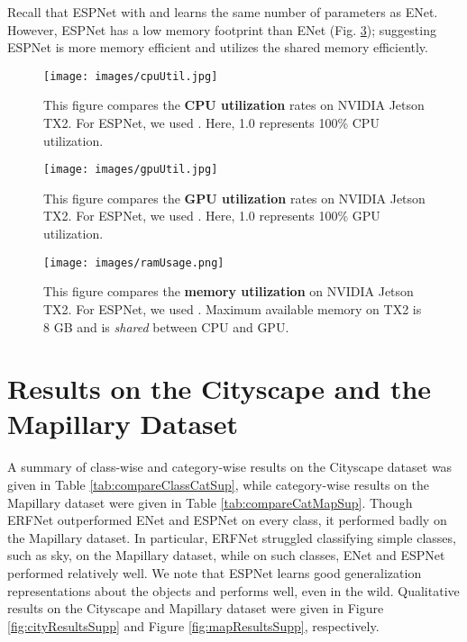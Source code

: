 \documentclass[runningheads]{llncs}
\def\Fig{Fig. }
\begin{document}
Recall that ESPNet with  and  learns the same number of parameters as ENet. However, ESPNet has a low memory footprint than ENet (\Fig \ref{fig:memUtilSupp}); suggesting ESPNet is more memory efficient and utilizes the shared memory efficiently.

\begin{figure}[t!]
\centering
\texttt{[image: images/cpuUtil.jpg]}
\caption{This figure compares the \textbf{CPU utilization} rates on NVIDIA Jetson TX2. For ESPNet, we used . Here, 1.0 represents 100\% CPU utilization.}
\label{fig:cpuUtilSupp}
\end{figure}

\begin{figure}[t!]
\centering
\texttt{[image: images/gpuUtil.jpg]}
\caption{This figure compares the \textbf{GPU utilization} rates on NVIDIA Jetson TX2. For ESPNet, we used . Here, 1.0 represents 100\% GPU utilization. }
\label{fig:gpuUtilSupp}
\end{figure}

\clearpage 

\begin{figure}[t!]
\centering
\texttt{[image: images/ramUsage.png]}
\caption{This figure compares the \textbf{memory utilization} on NVIDIA Jetson TX2. For ESPNet, we used . Maximum available memory on TX2 is 8 GB and is \textit{shared} between CPU and GPU.}
\label{fig:memUtilSupp}
\end{figure}


\section{Results on the Cityscape and the Mapillary Dataset}
\label{sec:resultsSup}
A summary of class-wise and category-wise results on the Cityscape \cite{cordts2016cityscapes} dataset was given in Table \ref{tab:compareClassCatSup}, while category-wise results on the Mapillary \cite{MVD2017} dataset were given in Table \ref{tab:compareCatMapSup}. Though ERFNet outperformed ENet and ESPNet on every class, it performed badly on the Mapillary dataset. In particular, ERFNet struggled classifying simple classes, such as sky, on the Mapillary dataset, while on such classes, ENet and ESPNet performed relatively well. We note that ESPNet learns good generalization representations about the objects and performs well, even in the wild. Qualitative results on the Cityscape and Mapillary dataset were given in Figure \ref{fig:cityResultsSupp} and Figure \ref{fig:mapResultsSupp}, respectively. 
\end{document}
